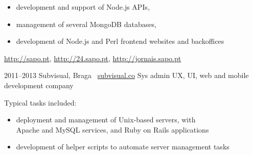 \documentclass[a4paper]{friggeri-cv}
\begin{document}
\begin{entrylist}
{\begin{itemize}
        \item development and support of Node.js APIs,
        \item management of several MongoDB databases,
        \item development of Node.js and Perl frontend websites and backoffices
    \end{itemize}
    \url{http://sapo.pt}, \url{http://24.sapo.pt}, \url{http://jornais.sapo.pt}
    }
  \entry
    {2011--2013}
    {Subvisual, Braga \textendash~\url{subvisual.co}}
    {Sys admin}
    {UX, UI, web and mobile development company}
    {Typical tasks included:
        \begin{itemize}
            \item deployment and management of Unix-based
            servers, with\\
            Apache and MySQL services, and Ruby on Rails applications
            \item development of helper scripts to automate
            server management tasks
            \end{itemize}
    }
\end{entrylist}
\end{document}

